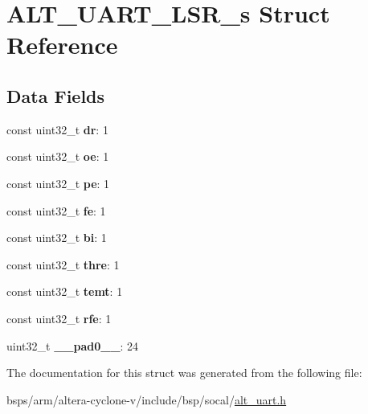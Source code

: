 \hypertarget{structALT__UART__LSR__s}{}\section{A\+L\+T\+\_\+\+U\+A\+R\+T\+\_\+\+L\+S\+R\+\_\+s Struct Reference}
\label{structALT__UART__LSR__s}
\subsection*{Data Fields}
\begin{DoxyCompactItemize}
\item 
\mbox{\label{structALT__UART__LSR__s_a4fa428479265e96df0c674662bc1b744}} 
const uint32\+\_\+t {\bfseries dr}\+: 1
\item 
\mbox{\label{structALT__UART__LSR__s_ae413ee553ced28eb6de0698dd25aa51d}} 
const uint32\+\_\+t {\bfseries oe}\+: 1
\item 
\mbox{\label{structALT__UART__LSR__s_ae7fbc5ba20ae7be339c22ac80764e024}} 
const uint32\+\_\+t {\bfseries pe}\+: 1
\item 
\mbox{\label{structALT__UART__LSR__s_a500fedca79b6dd0a7ffe8a1a4c94cca6}} 
const uint32\+\_\+t {\bfseries fe}\+: 1
\item 
\mbox{\label{structALT__UART__LSR__s_aac6fed4eb495fe4e184f951dad2eb0de}} 
const uint32\+\_\+t {\bfseries bi}\+: 1
\item 
\mbox{\label{structALT__UART__LSR__s_aec35220732898f1f0af1cc63c43d8879}} 
const uint32\+\_\+t {\bfseries thre}\+: 1
\item 
\mbox{\label{structALT__UART__LSR__s_a72defae2c64c4a6ed4fe82c8595f304c}} 
const uint32\+\_\+t {\bfseries temt}\+: 1
\item 
\mbox{\label{structALT__UART__LSR__s_a0eef80fe2cab0be5f7303677a69ded65}} 
const uint32\+\_\+t {\bfseries rfe}\+: 1
\item 
\mbox{\label{structALT__UART__LSR__s_a57947d4e8111b8aa472f05eea1e7e1f2}} 
uint32\+\_\+t {\bfseries \+\_\+\+\_\+pad0\+\_\+\+\_\+}\+: 24
\end{DoxyCompactItemize}


The documentation for this struct was generated from the following file\+:\begin{DoxyCompactItemize}
\item 
bsps/arm/altera-\/cyclone-\/v/include/bsp/socal/\mbox{\hyperlink{alt__uart_8h}{alt\+\_\+uart.\+h}}\end{DoxyCompactItemize}
